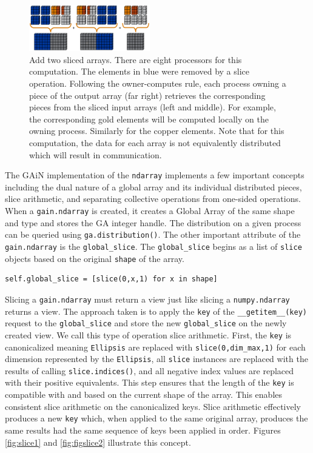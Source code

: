 \documentclass{sigplanconf}
\begin{document}
\begin{figure}[htb]
\centering
\includegraphics[width=0.47\textwidth]{image2_crop.eps}
\caption{
Add two sliced arrays. There are eight processors for this computation.  The
elements in blue were removed by a slice operation. Following the
owner-computes rule, each process owning a piece of the output array (far
right) retrieves the corresponding pieces from the sliced input arrays (left
and middle). For example, the corresponding gold elements will be computed
locally on the owning process. Similarly for the copper elements.  Note that
for this computation, the data for each array is not equivalently distributed
which will result in communication.
}
\label{fig:3}
\end{figure}

The GAiN implementation of the \verb=ndarray= implements a few important
concepts including the dual nature of a global array and its individual
distributed pieces, slice arithmetic, and separating collective operations
from one-sided operations. When a \verb=gain.ndarray= is created, it creates a
Global Array of the same shape and type and stores the GA integer handle. The
distribution on a given process can be queried using \verb=ga.distribution()=.
The other important attribute of the \verb=gain.ndarray= is the
\verb=global_slice=.  The \verb=global_slice= begins as a list of \verb=slice=
objects based on the original \verb=shape= of the array.

\begin{verbatim}
self.global_slice = [slice(0,x,1) for x in shape]
\end{verbatim}

Slicing a \verb=gain.ndarray= must return a view just like slicing a
\verb=numpy.ndarray= returns a view. The approach taken is to apply the
\verb=key= of the \verb=__getitem__(key)= request to the \verb=global_slice=
and store the new \verb=global_slice= on the newly created view. We call this
type of operation slice arithmetic. First, the \verb=key= is canonicalized
meaning \verb=Ellipsis= are replaced with \verb=slice(0,dim_max,1)= for each
dimension represented by the \verb=Ellipsis=, all \verb=slice= instances are
replaced with the results of calling \verb=slice.indices()=, and all negative
index values are replaced with their positive equivalents. This step ensures
that the length of the \verb=key= is compatible with and based on the current
shape of the array.  This enables consistent slice arithmetic on the
canonicalized keys. Slice arithmetic effectively produces a new \verb=key=
which, when applied to the same original array, produces the same results had
the same sequence of keys been applied in order. Figures \ref{fig:slice1}
and \ref{fig:figslice2} illustrate this concept.
\end{document}

